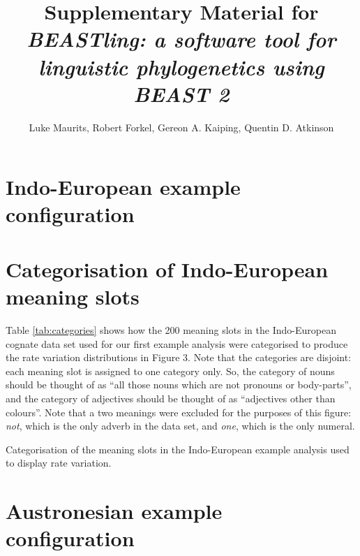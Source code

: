 \documentclass[10pt,a4paper]{article}
\begin{document}
\title{Supplementary Material for \emph{BEASTling: a software tool for linguistic phylogenetics using BEAST 2}}
\author{Luke Maurits, Robert Forkel, Gereon A. Kaiping, Quentin D. Atkinson}
\maketitle

\section{Indo-European example configuration}

\begin{alltt}

\end{alltt}

\section{Categorisation of Indo-European meaning slots}

Table \ref{tab:categories} shows how the 200 meaning slots in the Indo-European cognate data set used for our first example analysis were categorised to produce the rate variation distributions in Figure 3.  Note that the categories are disjoint: each meaning slot is assigned to one category only.  So, the category of nouns should be thought of as ``all those nouns which are not pronouns or body-parts'', and the category of adjectives should be thought of as ``adjectives other than colours''.  Note that a two meanings were excluded for the purposes of this figure: \emph{not}, which is the only adverb in the data set, and \emph{one}, which is the only numeral. 

\begin{table}[]
	\begin{center}
	\small
	
	\end{center}
	\caption{Categorisation of the meaning slots in the Indo-European example analysis used to display rate variation.}
\label{tab:categories}
\end{table}

\section{Austronesian example configuration}

\begin{alltt}

\end{alltt}
\end{document}
